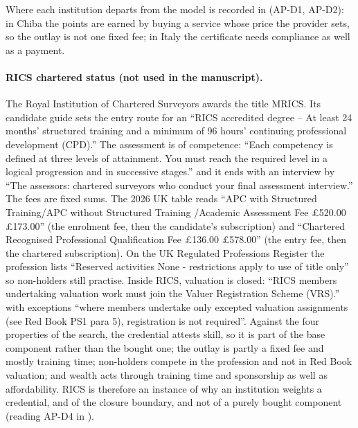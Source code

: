 \documentclass[11pt,a4paper]{article}
\newcommand{\pq}[2]{``#2''}
\begin{document}
Where each institution departs from the model is recorded in
 (AP-D1, AP-D2): in Chiba the points
are earned by buying a service whose price the provider sets, so the outlay is
not one fixed fee; in Italy the certificate needs compliance as well as a
payment.

\paragraph{RICS chartered status (not used in the manuscript).} The Royal
Institution of Chartered Surveyors awards the title MRICS. Its candidate guide
sets the entry route for an
\pq{rics/apc_candidate_guide_2026.pdf}{RICS accredited degree – At least 24 months’ structured training and a minimum of 96 hours’ continuing professional development (CPD).}
The assessment is of competence:
\pq{rics/apc_candidate_guide_2026.pdf}{Each competency is defined at three levels of attainment. You must reach the required level in a logical progression and in successive stages.}
and it ends with an interview by
\pq{rics/apc_candidate_guide_2026.pdf}{The assessors: chartered surveyors who conduct your final assessment interview.}
The fees are fixed sums. The 2026 UK table reads
\pq{rics/join_fees.html}{APC with Structured Training/APC without Structured Training /Academic Assessment Fee £520.00 £173.00}
(the enrolment fee, then the candidate's subscription) and
\pq{rics/join_fees.html}{Chartered Recognised Professional Qualification Fee £136.00 £578.00}
(the entry fee, then the chartered subscription). On the UK Regulated
Professions Register the profession lists
\pq{rics/gov_regulated_profession.html}{Reserved activities None - restrictions apply to use of title only}
so non-holders still practise. Inside RICS, valuation is closed:
\pq{rics/vr_faq_2025.pdf}{RICS members undertaking valuation work must join the Valuer Registration Scheme (VRS).}
with exceptions
\pq{rics/vr_faq_2025.pdf}{where members undertake only excepted valuation assignments (see Red Book PS1 para 5), registration is not required}.
Against the four properties of the search, the credential attests skill, so it
is part of the base component rather than the bought one; the outlay is partly
a fixed fee and mostly training time; non-holders compete in the profession
and not in Red Book valuation; and wealth acts through training time and
sponsorship as well as affordability. RICS is therefore an instance of why an
institution weights a credential, and of the closure boundary, and not of a
purely bought component (reading AP-D4 in ).
\end{document}
